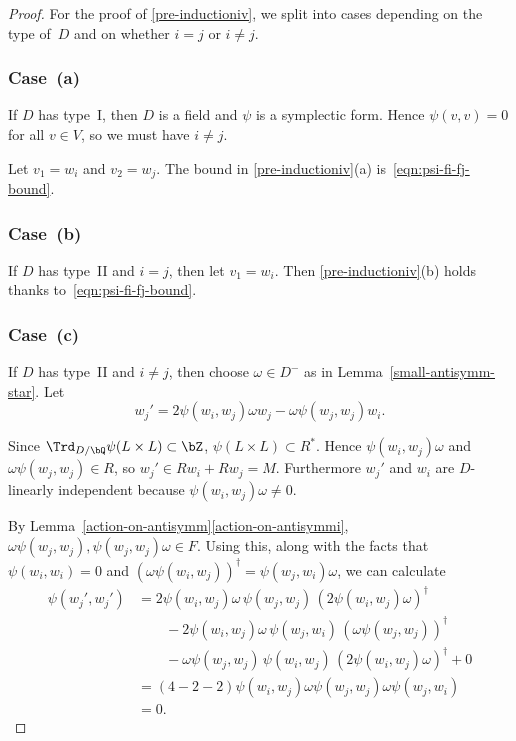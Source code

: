 \begin{proof}
For the proof of \eqref{pre-inductioniv}, we split into cases depending on the type of~$D$ and on whether $i=j$ or $i \neq j$.

\subsubsection*{Case~(a)}

If $D$ has type~I, then $D$ is a field and $\psi$ is a symplectic form.
Hence $\psi(v,v) = 0$ for all $v \in V$, so we must have $i \neq j$.

Let $v_1 = w_i$ and $v_2 = w_j$.
The bound in \eqref{pre-inductioniv}(a) is~\eqref{eqn:psi-fi-fj-bound}.

\subsubsection*{Case~(b)}

If $D$ has type~II and $i=j$, then let $v_1 = w_i$.
Then \eqref{pre-inductioniv}(b) holds thanks to~\eqref{eqn:psi-fi-fj-bound}.

\subsubsection*{Case~(c)}
If $D$ has type~II and $i \neq j$, then choose $\omega \in D^-$ as in Lemma~\ref{small-antisymm-star}.
Let\vspace*{-3pt}
\[
w_j' = 2\psi(w_i, w_j)\omega w_j - \omega\psi(w_j, w_j) w_i.
\]

\pagebreak[2]
\noindent
Since $\Trd_{D/\bQ} \psi(L \times L) \subset \bZ$, $\psi(L \times L) \subset R^*$.
Hence $\psi(w_i, w_j)\omega$ and $\omega\psi(w_j, w_j) \in R$, so $w_j' \in Rw_i + Rw_j = M$.
Furthermore $w_j'$ and $w_i$ are $D$-linearly independent because $\psi(w_i, w_j)\omega \neq 0$.

By Lemma~\ref{action-on-antisymm}\eqref{action-on-antisymmi}, $\omega\psi(w_j, w_j), \psi(w_j, w_j)\omega \in F$.
Using this, along with the facts that $\psi(w_i,w_i) = 0$ and $(\omega \psi(w_i, w_j))^\dag = \psi(w_j, w_i) \omega$, we can calculate
\begin{align*}
\psi(w_j', w_j')
& = 2\psi(w_i, w_j) \omega \, \psi(w_j, w_j) \, (2\psi(w_i, w_j) \omega)^\dag
\\& \qquad - 2\psi(w_i, w_j) \omega \, \psi(w_j, w_i) \, (\omega \psi(w_j, w_j))^\dag
\\& \qquad - \omega \psi(w_j, w_j) \, \psi(w_i, w_j) \, (2\psi(w_i, w_j) \omega)^\dag
+ 0
\\& = (4-2-2) \psi(w_i, w_j) \omega \psi(w_j, w_j) \omega \psi(w_j, w_i)
\\& = 0.
\end{align*}


\end{proof}
